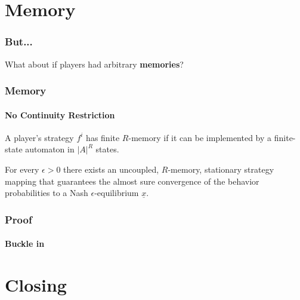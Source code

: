 \documentclass{beamer}
\newcommand{\eq}[1]{\underline{#1}}
\begin{document}

\section{Memory}

\begin{frame}
    \frametitle{But...}
    \begin{center}
        What about if players had arbitrary \textbf{memories}?
    \end{center} 
\end{frame}

\begin{frame}
    \frametitle{Memory}
    \framesubtitle{No Continuity Restriction}
    \begin{definition}
        A player's strategy $f^i$ has finite $R$-memory if it can be implemented by a finite-state 
        automaton in $|A|^R$ states.
    \end{definition}
    \pause
    \begin{theorem}
        For every $\epsilon > 0$ there exists an uncoupled, $R$-memory,
        stationary strategy mapping that guarantees the
        almost sure convergence of the behavior probabilities to a Nash $\epsilon$-equilibrium $\eq{x}$.
    \end{theorem}
\end{frame}


\begin{frame}
    \frametitle{Proof}
    \framesubtitle{Buckle in}

    \begin{definition}
    \end{definition}
\end{frame}

\section{Closing}
 
\end{document}
